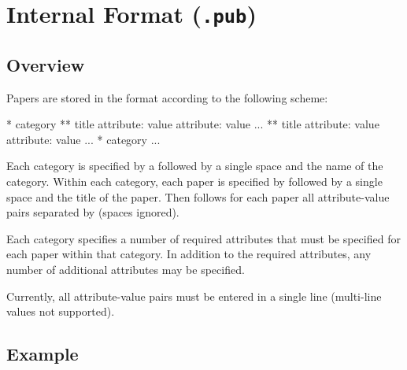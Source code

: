 \chapter{Internal Format (\texttt{.pub})}
\label{pubformat}

\section{Overview}

Papers are stored in the  format according to the following scheme:
\begin{code}
* category
** title
   attribute: value
   attribute: value
   ...
** title
   attribute: value
   attribute: value
   ...
* category
   ...
\end{code}

Each category is specified by a \emp{*} followed by a single space and
the name of the category.  Within each category, each paper is
specified by \emp{**} followed by a single space and the title of the
paper. Then follows for each paper all attribute-value pairs separated
by \emp{:} (spaces ignored).

Each category specifies a number of required attributes that must be
specified for each paper within that category. In addition to the
required attributes, any number of additional attributes may be
specified.

Currently, all attribute-value pairs must be entered in a single line
(multi-line values not supported).

\section{Example}


